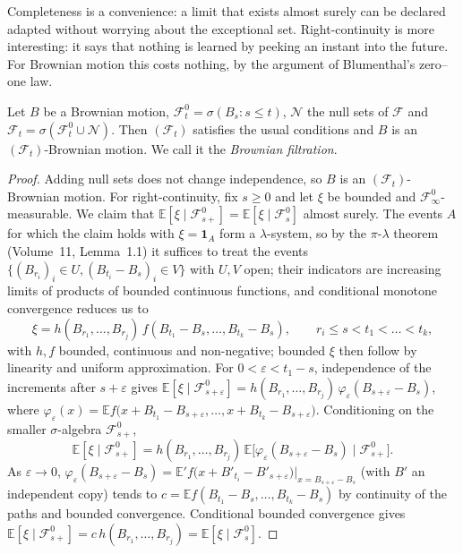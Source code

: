 Completeness is a convenience: a limit that exists almost surely can be declared adapted without worrying about the exceptional set. Right-continuity is more interesting: it says that
nothing is learned by peeking an instant into the future. For Brownian motion this costs nothing, by the argument of Blumenthal's zero--one law.

\begin{proposition}\label{prop:brownfilt}
Let $B$ be a Brownian motion, $\mathcal F^0_t=\sigma(B_s:s\le t)$, $\mathcal N$ the null sets of $\mathcal F$ and $\mathcal F_t=\sigma(\mathcal F^0_t\cup\mathcal N)$. Then $(\mathcal F_t)$ satisfies the usual conditions and
$B$ is an $(\mathcal F_t)$-Brownian motion. We call it the \emph{Brownian filtration}.
\end{proposition}

\begin{proof}
Adding null sets does not change independence, so $B$ is an $(\mathcal F_t)$-Brownian motion. For right-continuity, fix $s\ge0$ and let $\xi$ be bounded and $\mathcal F^0_\infty$-measurable. We claim
that $\mathbb E[\xi\mid\mathcal F^0_{s+}]=\mathbb E[\xi\mid\mathcal F^0_s]$ almost surely. The events $A$ for which the claim holds with $\xi=\mathbf 1_A$ form a $\lambda$-system, so by the $\pi$-$\lambda$ theorem (Volume~11, Lemma~1.1) it suffices to treat the events
$\{(B_{r_i})_i\in U,(B_{t_i}-B_s)_i\in V\}$ with $U,V$ open; their indicators are increasing limits of products of bounded continuous functions, and conditional monotone convergence reduces us to
\[
\xi=h(B_{r_1},\dots,B_{r_j})\,f(B_{t_1}-B_s,\dots,B_{t_k}-B_s),\qquad r_i\le s<t_1<\dots<t_k,
\]
with $h,f$ bounded, continuous and non-negative; bounded $\xi$ then follow by linearity and uniform approximation. For $0<\varepsilon<t_1-s$, independence of the increments after $s+\varepsilon$ gives
$\mathbb E[\xi\mid\mathcal F^0_{s+\varepsilon}]=h(B_{r_1},\dots,B_{r_j})\,\varphi_\varepsilon(B_{s+\varepsilon}-B_s)$, where $\varphi_\varepsilon(x)=\mathbb E f\bigl(x+B_{t_1}-B_{s+\varepsilon},\dots,x+B_{t_k}-B_{s+\varepsilon}\bigr)$.
Conditioning on the smaller $\sigma$-algebra $\mathcal F^0_{s+}$,
\[
\mathbb E[\xi\mid\mathcal F^0_{s+}]=h(B_{r_1},\dots,B_{r_j})\,\mathbb E\bigl[\varphi_\varepsilon(B_{s+\varepsilon}-B_s)\mid\mathcal F^0_{s+}\bigr].
\]
As $\varepsilon\to0$, $\varphi_\varepsilon(B_{s+\varepsilon}-B_s)=\mathbb E'f\bigl(x+B'_{t_i}-B'_{s+\varepsilon}\bigr)|_{x=B_{s+\varepsilon}-B_s}$ (with $B'$ an independent copy) tends to $c=\mathbb Ef(B_{t_1}-B_s,\dots,B_{t_k}-B_s)$
by continuity of the paths and bounded convergence. Conditional bounded convergence gives $\mathbb E[\xi\mid\mathcal F^0_{s+}]=c\,h(B_{r_1},\dots,B_{r_j})=\mathbb E[\xi\mid\mathcal F^0_s]$.


\end{proof}
